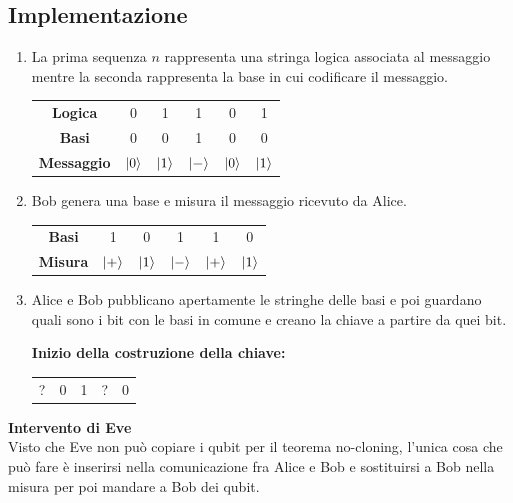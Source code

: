 \documentclass[12pt, a4paper]{report}
\begin{document}
\subsection{Implementazione}
\begin{enumerate}
    \item La prima sequenza $n$ rappresenta una stringa logica associata al messaggio mentre la seconda rappresenta la base in cui codificare il messaggio. 
    \begin{center}
        \begin{tabular}{c c c c c c}
            \textbf{Logica} & 0 & 1 & 1 & 0 & 1  \\
            \textbf{Basi} & 0 & 0 & 1 & 0 & 0  \\
            \textbf{Messaggio} & $| 0 \rangle$ & $| 1 \rangle$ & $| - \rangle$ & $| 0 \rangle$ & $| 1 \rangle$  \\
        \end{tabular}
    \end{center}
    \item Bob genera una base e misura il messaggio ricevuto da Alice.     \begin{center}
        \begin{tabular}{c c c c c c}
            \textbf{Basi} & 1 & 0 & 1 & 1 & 0  \\
            \textbf{Misura} & $| + \rangle$ & $| 1 \rangle$ & $| - \rangle$ & $| + \rangle$ & $| 1 \rangle$  \\
        \end{tabular}
    \end{center} 
    \item Alice e Bob pubblicano apertamente le stringhe delle basi e poi guardano quali sono i bit con le basi in comune e creano la chiave a partire da quei bit.
    \begin{center}
        \textbf{Inizio della costruzione della chiave:}\begin{tabular}{c c c c c}
            ? & 0 & 1 & ? & 0  \\
        \end{tabular}
    \end{center}
\end{enumerate}
\textbf{Intervento di Eve}\\
Visto che Eve non può copiare i qubit per il teorema no-cloning, l'unica cosa che può  fare è inserirsi nella comunicazione fra Alice e  Bob e sostituirsi a Bob nella misura per poi mandare a Bob dei qubit.
\end{document}
